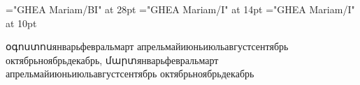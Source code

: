 
\font\hybig="GHEA Mariam/BI" at 28pt
\font\hyfourteen="GHEA Mariam/I" at 14pt
\font\hyten="GHEA Mariam/I" at 10pt


\pdfpagewidth=105mm
\pdfpageheight=148.5mm

\hsize=80mm
\vsize=133mm

\hoffset=-12.5mm
\voffset=-12.5mm

\parindent=0pt
\nopagenumbers



\centerline{\vbox{}}
\line{\hrulefill}


\def\hymonthname{\relax}
\def\enmonthname{\relax}
\def\rumonthname{\relax}

\def\հունվար{1}
\def\փետրվար{2}
\def\մարտ{3}
\def\ապրիլ{4}
\def\մայիս{5}
\def\հունիս{6}
\def\հուլիս{7}
\def\օգոստոս{8}
\def\սեպտեմբեր{9}
\def\հոկտեմբեր{10}
\def\նոյեմբեր{11}
\def\դեկտեմբեր{12}

\def\rumonth#1{
  \ifcase\csname #1\endcsname\or январь\or февраль\or март
  \or апрель\or май\or июнь\or июль\or август\or сентябрь%
  \or октябрь\or ноябрь\or декабрь\fi}
\def\enmonth#1{
  \ifcase\csname #1\endcsname\or january\or february\or march%
  \or april\or may\or june\or july\or august\or septemver%
  \or october\or november\or december\fi}
\def\setmonth#1{%
  \global\def\hymonthname{#1}
  \global\def\enmonthname{\enmonth{#1}}
  \global\def\rumonthname{\rumonth{#1}}}

\hyten
\rumonth{օգոստոս}, \rumonth{մարտ}

\bye
